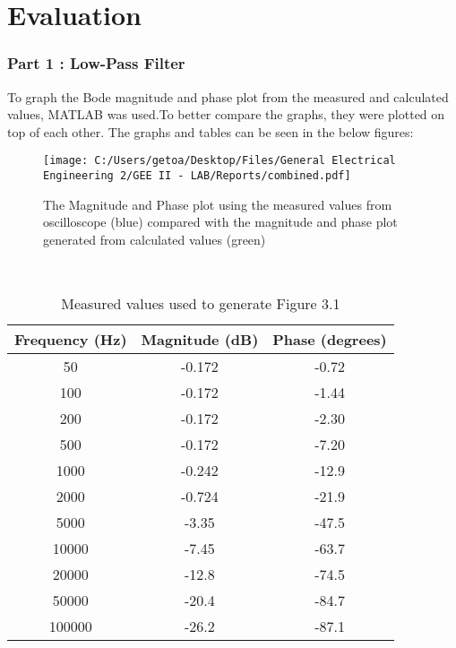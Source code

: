 \documentclass[12pt]{report}
\begin{document}
\chapter {Evaluation }

\subsection {Part 1 : Low-Pass Filter } 
To graph the Bode magnitude and phase plot from the measured and calculated values, MATLAB was used.To better compare the graphs, they were plotted on top of each other. The graphs and tables can be seen in the below figures:\\
\begin{figure}[!htp]
\centering
\texttt{[image: C:/Users/getoa/Desktop/Files/General Electrical Engineering 2/GEE II - LAB/Reports/combined.pdf]}
\caption{The Magnitude and Phase plot using the measured values from oscilloscope (blue) compared with the magnitude and phase plot generated from calculated values (green)}
\end{figure}\\
\begin{table}
\centering
\begin{tabular}{|c|c|c|}
\hline
\textbf{Frequency (Hz)} & \textbf{Magnitude (dB)} & \textbf{Phase (degrees)} \\ \hline
50 & -0.172 & -0.72 \\ \hline
100 & -0.172 & -1.44 \\ \hline
200 & -0.172 & -2.30 \\ \hline
500 & -0.172 & -7.20 \\ \hline
1000 & -0.242 & -12.9 \\ \hline
2000 & -0.724 & -21.9 \\ \hline
5000 & -3.35 & -47.5 \\ \hline
10000 & -7.45 & -63.7 \\ \hline
20000 & -12.8 & -74.5 \\ \hline
50000 & -20.4 & -84.7 \\ \hline
100000 & -26.2 & -87.1 \\ \hline
\end{tabular}
\caption{Measured values used to generate Figure 3.1}
\end{table}
\end{document}
